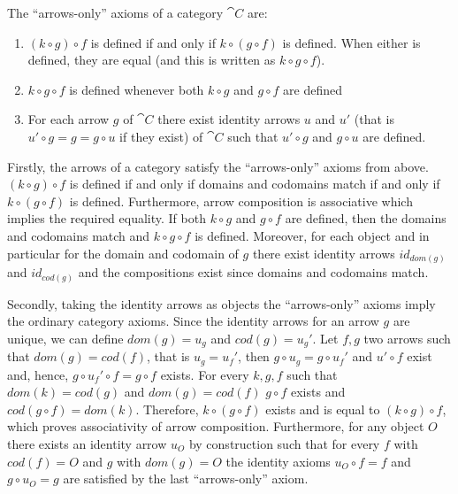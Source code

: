 
The ``arrows-only'' axioms of a category $\cat{C}$ are:

\begin{enumerate}
	\item $(k ∘ g) ∘ f$ is defined if and only if $k ∘ (g ∘ f)$ is defined. When either is defined, they are equal (and this is written as $k ∘ g ∘ f$).
	\item $k ∘ g ∘ f$ is defined whenever both $k ∘ g$ and $g ∘ f$ are defined
	\item For each arrow $g$ of $\cat{C}$ there exist identity arrows $u$ and $u'$ (that is $u' ∘ g = g = g ∘ u$ if they exist) of $\cat{C}$ such that $u' ∘ g$ and $g ∘ u$ are defined.
\end{enumerate}

Firstly, the arrows of a category satisfy the ``arrows-only'' axioms from above. $(k ∘ g) ∘ f$ is defined if and only if domains and codomains match if and only if $k ∘ (g ∘ f)$ is defined. Furthermore, arrow composition is associative which implies the required equality. If both $k ∘ g$ and $g ∘ f$ are defined, then the domains and codomains match and $k ∘ g ∘ f$ is defined. Moreover, for each object and in particular for the domain and codomain of $g$ there exist identity arrows $id_{dom(g)}$ and $id_{cod(g)}$ and the compositions exist since domains and codomains match.

Secondly, taking the identity arrows as objects the ``arrows-only'' axioms imply the ordinary category axioms. Since the identity arrows for an arrow $g$ are unique, we can define $dom(g) = u_g$ and $cod(g) = u_g'$. Let $f, g$ two arrows such that $dom(g) = cod(f)$, that is $u_g = u_f'$, then $g ∘ u_g = g ∘ u_f'$ and $u' ∘ f$ exist and, hence, $g ∘ u_f' ∘ f = g ∘ f$ exists. For every $k, g, f$ such that $dom(k) = cod(g)$ and $dom(g) = cod(f)$ $g ∘ f$ exists and $cod(g ∘ f) = dom(k)$. Therefore, $k ∘ (g ∘ f)$ exists and is equal to $(k ∘ g) ∘ f$, which proves associativity of arrow composition. Furthermore, for any object $O$ there exists an identity arrow $u_O$ by construction such that for every $f$ with $cod(f) = O$ and $g$ with $dom(g) = O$ the identity axioms $u_O ∘ f = f$ and $g ∘ u_O = g$ are satisfied by the last ``arrows-only'' axiom.

